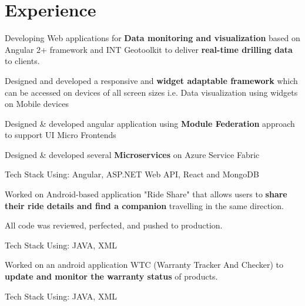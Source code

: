 \documentclass[a4paper]{deedy-resume-openfont}
\begin{document}
\begin{minipage}[t]{0.66\textwidth} 


\section{Experience}

\vspace{\topsep} %
\begin{tightemize}
 \item Developing Web applications for \textbf{Data monitoring and visualization} based on Angular 2+ framework and INT Geotoolkit to deliver \textbf{real-time drilling data} to clients.
 \item Designed and developed a responsive and \textbf{widget adaptable framework} which can be accessed on devices of all screen sizes i.e. Data visualization using widgets on Mobile devices
 \item Designed \& developed angular application using \textbf{Module Federation} approach to support UI Micro Frontends
 \item Designed \& developed several \textbf{Microservices} on Azure Service Fabric
 \item Tech Stack Using: Angular, ASP.NET Web API, React and MongoDB
\end{tightemize}
\sectionsep


\begin{tightemize}
 \item Worked on Android-based application "Ride Share" that allows users to \textbf{share their ride details and find a companion} travelling in the same direction.
 \item All code was reviewed, perfected, and pushed to production.
 \item Tech Stack Using: JAVA, XML
\end{tightemize}
\sectionsep


\begin{tightemize}
 \item Worked on an android application WTC (Warranty Tracker And Checker) to \textbf{update and monitor the warranty status} of products.
 \item Tech Stack Using: JAVA, XML
\end{tightemize}
\sectionsep



\end{minipage}
\end{document}
